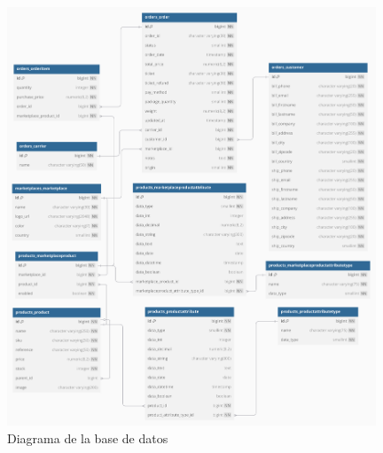 




\begin{figure} [H]
    \centering
    \includegraphics[width=0.98\textwidth]{figures/design_develop/database_diagram.pdf}
    \caption{Diagrama de la base de datos}
    \label{fig:diagrama_base_datos}
\end{figure}